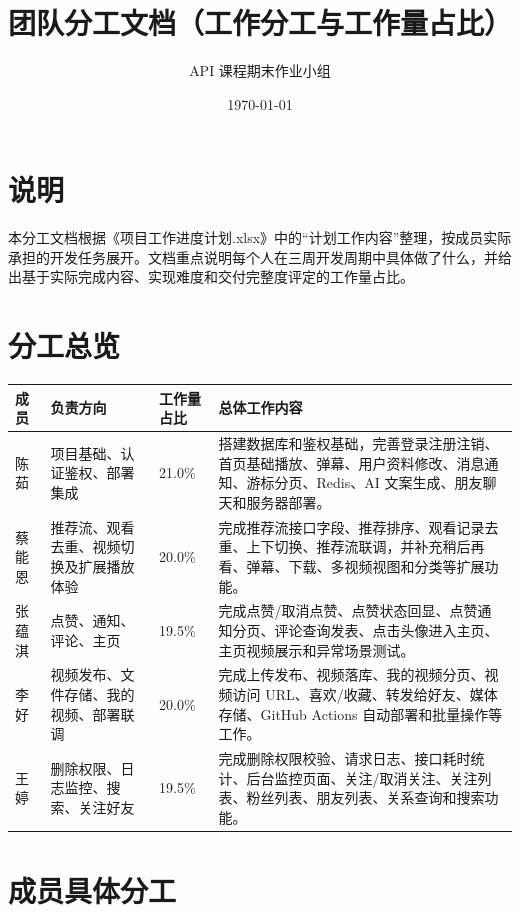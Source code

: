 \documentclass[UTF8,a4paper,12pt,fontset=fandol]{ctexart}
\title{\textbf{团队分工文档（工作分工与工作量占比）}}
\author{API 课程期末作业小组}
\date{\today}
\begin{document}
\maketitle
\tableofcontents
\newpage

\section{说明}
本分工文档根据《项目工作进度计划.xlsx》中的“计划工作内容”整理，按成员实际承担的开发任务展开。文档重点说明每个人在三周开发周期中具体做了什么，并给出基于实际完成内容、实现难度和交付完整度评定的工作量占比。

\section{分工总览}
\begin{table}[H]
\centering
\small
\begin{tabularx}{\textwidth}{p{1.8cm} p{3.2cm} p{1.9cm} X}
\toprule
成员 & 负责方向 & 工作量占比 & 总体工作内容 \\
\midrule
陈茹 & 项目基础、认证鉴权、部署集成 & 21.0\% & 搭建数据库和鉴权基础，完善登录注册注销、首页基础播放、弹幕、用户资料修改、消息通知、游标分页、Redis、AI 文案生成、朋友聊天和服务器部署。 \\
蔡能恩 & 推荐流、观看去重、视频切换及扩展播放体验 & 20.0\% & 完成推荐流接口字段、推荐排序、观看记录去重、上下切换、推荐流联调，并补充稍后再看、弹幕、下载、多视频视图和分类等扩展功能。 \\
张蕴淇 & 点赞、通知、评论、主页 & 19.5\% & 完成点赞/取消点赞、点赞状态回显、点赞通知分页、评论查询发表、点击头像进入主页、主页视频展示和异常场景测试。 \\
李好 & 视频发布、文件存储、我的视频、部署联调 & 20.0\% & 完成上传发布、视频落库、我的视频分页、视频访问 URL、喜欢/收藏、转发给好友、媒体存储、GitHub Actions 自动部署和批量操作等工作。 \\
王婷 & 删除权限、日志监控、搜索、关注好友 & 19.5\% & 完成删除权限校验、请求日志、接口耗时统计、后台监控页面、关注/取消关注、关注列表、粉丝列表、朋友列表、关系查询和搜索功能。 \\
\bottomrule
\end{tabularx}
\normalsize
\end{table}

\section{成员具体分工}
\end{document}
